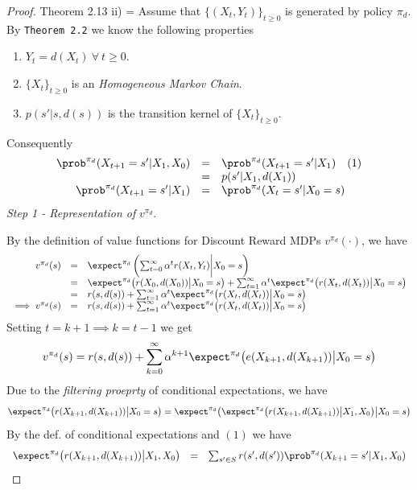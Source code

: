 \documentclass[11pt,a4paper]{article}
\begin{document}
  \begin{proof}{Theorem 2.13 ii)}
    \everymath={\displaystyle}
    Assume that $\{(X_t,Y_t)\}_{t\geq0}$ is generated by policy $\pi_d$. By \texttt{Theorem 2.2}  we know the following properties
    \begin{enumerate}
      \item $Y_t=d(X_t)\ \forall\ t\geq0$.
      \item $\{X_t\}_{t\geq0}$ is an \textit{Homogeneous Markov Chain}.
      \item $p(s'|s,d(s))$ is the transition kernel of $\{X_t\}_{t\geq0}$.
    \end{enumerate}
    Consequently
    \[\begin{array}{rcl}
      \prob^{\pi_d}(X_{t+1}=s'|X_1,X_0)&=&\prob^{\pi_d}(X_{t+1}=s'|X_1)\quad(1)\\
      &=&p(s'|X_1,d(X_1))\\
      \prob^{\pi_d}(X_{t+1}=s'|X_1)&=&\prob^{\pi_d}(X_t=s'|X_0=s)
    \end{array}\]
    \textit{Step 1 - Representation of }$v^{\pi_d}$.
    \par By the definition of value functions for Discount Reward MDPs $v^{\pi_d}(\cdot)$, we have
    \[\begin{array}{rcl}
      v^{\pi_d}(s)&=&\expect^{\pi_d}\left(\sum_{t=0}^\infty\alpha^tr(X_t,Y_t)\bigg|X_0=s\right)\\
      &=&\expect^{\pi_d}\big(r(X_0,d(X_0))\big|X_0=s\big)+\sum_{t=1}^\infty\alpha^t\expect^{\pi_d}\big(r(X_t,d(X_t))\big|X_0=s\big)\\
      &=&r(s,d(s))+\sum_{t=1}^\infty\alpha^t\expect^{\pi_d}\big(r(X_t,d(X_t))\big|X_0=s\big)\\
      \implies v^{\pi_d}(s)&=&r(s,d(s))+\sum_{t=1}^\infty\alpha^t\expect^{\pi_d}\big(r(X_t,d(X_t))\big|X_0=s\big)
    \end{array}\]
    Setting $t=k+1\implies k=t-1$ we get
    \[ v^{\pi_d}(s)=r(s,d(s))+\sum_{k=0}^\infty\alpha^{k+1}\expect^{\pi_d}\big(e(X_{k+1},d(X_{k+1}))\big|X_0=s\big) \]
    Due to the \textit{filtering proeprty} of conditional expectations, we have
    \[ \expect^{\pi_d}\big(r(X_{k+1},d(X_{k+1}))\big|X_0=s\big)=\expect^{\pi_d}\big(\expect^{\pi_d}\big(r(X_{k+1},d(X_{k+1}))\big|X_1,X_0\big)\big|X_0=s\big) \]
    By the def. of conditional expectations and $(1)$ we have
    \[\begin{array}{rcl}
      \expect^{\pi_d}\big(r(X_{k+1},d(X_{k+1}))\big|X_1,X_0\big)&=&\sum_{s'\in S}r(s',d(s'))\prob^{\pi_d}(X_{k+1}=s'|X_1,X_0)\\

\end{array}\]
\end{proof}
\end{document}
